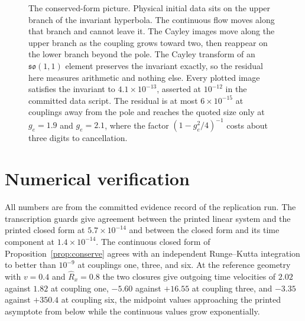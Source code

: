 \documentclass[aps,prd,reprint,nofootinbib]{revtex4-2}
\begin{document}
\begin{figure}[t]
\centering
{}
\caption{The conserved-form picture.  Physical initial data sits on the
upper branch of the invariant hyperbola.  The continuous flow moves
along that branch and cannot leave it.  The Cayley images move along the
upper branch as the coupling grows toward two, then reappear on the
lower branch beyond the pole.  The Cayley transform of an
$\mathfrak{so}(1,1)$ element preserves the invariant exactly, so the
residual here measures arithmetic and nothing else.  Every plotted
image satisfies the invariant to $4.1 \times 10^{-13}$, asserted at
$10^{-12}$ in the committed data script.  The residual is at most
$6 \times 10^{-15}$ at couplings away from the pole and reaches the
quoted size only at $g_{e} = 1.9$ and $g_{e} = 2.1$, where the factor
$(1 - g_{e}^{2}/4)^{-1}$ costs about three digits to cancellation.}
\label{fig:hyperbola}
\end{figure}

\section{Numerical verification}
\label{sec:verify}

All numbers are from the committed evidence record of the replication
run.  The transcription guards give agreement between the printed
linear system and the printed closed form at $5.7 \times 10^{-14}$ and
between the closed form and its time component at
$1.4 \times 10^{-14}$.  The continuous closed form of
Proposition~\ref{prop:conserve} agrees with an independent
Runge--Kutta integration to better than $10^{-9}$ at couplings one,
three, and six.  At the reference geometry with $v = 0.4$ and
$\hat R_{x} = 0.8$ the two closures give outgoing time velocities of
$2.02$ against $1.82$ at coupling one, $-5.60$ against $+16.55$ at
coupling three, and $-3.35$ against $+350.4$ at coupling six, the
midpoint values approaching the printed asymptote from below while the
continuous values grow exponentially.
\end{document}

